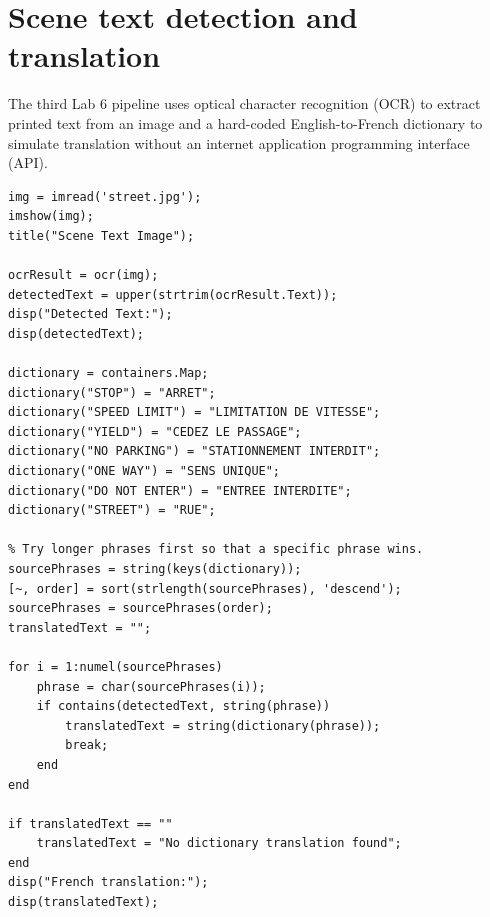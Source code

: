 \section{Scene text detection and translation}

The third Lab 6 pipeline uses optical character recognition (OCR) to extract printed text from an image and a hard-coded English-to-French dictionary to simulate translation without an internet application programming interface (API).

\begin{mlfigure}
\end{mlfigure}

\begin{lstlisting}[style=mlmatlab]
img = imread('street.jpg');
imshow(img);
title("Scene Text Image");

ocrResult = ocr(img);
detectedText = upper(strtrim(ocrResult.Text));
disp("Detected Text:");
disp(detectedText);

dictionary = containers.Map;
dictionary("STOP") = "ARRET";
dictionary("SPEED LIMIT") = "LIMITATION DE VITESSE";
dictionary("YIELD") = "CEDEZ LE PASSAGE";
dictionary("NO PARKING") = "STATIONNEMENT INTERDIT";
dictionary("ONE WAY") = "SENS UNIQUE";
dictionary("DO NOT ENTER") = "ENTREE INTERDITE";
dictionary("STREET") = "RUE";

% Try longer phrases first so that a specific phrase wins.
sourcePhrases = string(keys(dictionary));
[~, order] = sort(strlength(sourcePhrases), 'descend');
sourcePhrases = sourcePhrases(order);
translatedText = "";

for i = 1:numel(sourcePhrases)
    phrase = char(sourcePhrases(i));
    if contains(detectedText, string(phrase))
        translatedText = string(dictionary(phrase));
        break;
    end
end

if translatedText == ""
    translatedText = "No dictionary translation found";
end
disp("French translation:");
disp(translatedText);
\end{lstlisting}

